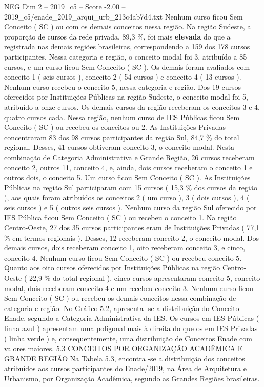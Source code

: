 \begin{textsample}{NEG Dim 2 – 2019\_c5 – Score -2.00 – 2019\_c5/enade\_2019\_arqui\_urb\_213c4ab7d4.txt}
Nenhum curso ficou Sem Conceito ( SC ) ou com os demais conceitos nessa região.
Na região Sudeste, a proporção de cursos da rede privada, 89,3 \%, foi mais \textbf{elevada} do que a registrada nas demais regiões brasileiras, correspondendo a 159 dos 178 cursos participantes.
Nessa categoria e região, o conceito modal foi 3, atribuído a 85 cursos, e um curso ficou Sem Conceito ( SC ).
Os demais foram avaliados com conceito 1 ( seis cursos ), conceito 2 ( 54 cursos ) e conceito 4 ( 13 cursos ).
Nenhum curso recebeu o conceito 5, nessa categoria e região.
Dos 19 cursos oferecidos por Instituições Públicas na região Sudeste, o conceito modal foi 5, atribuído a onze cursos.
Os demais cursos da região receberam os conceitos 3 e 4, quatro cursos cada.
Nessa região, nenhum curso de IES Públicas ficou Sem Conceito ( SC ) ou recebeu os conceitos ou 2.
As Instituições Privadas concentraram 83 dos 98 cursos participantes da região Sul, 84,7 \% do total regional.
Desses, 41 cursos obtiveram conceito 3, o conceito modal.
Nesta combinação de Categoria Administrativa e Grande Região, 26 cursos receberam conceito 2, outros 11, conceito 4, e, ainda, dois cursos receberam o conceito 1 e outros dois, o conceito 5.
Um curso ficou Sem Conceito ( SC ).
As Instituições Públicas na região Sul participaram com 15 cursos ( 15,3 \% dos cursos da região ), aos quais foram atribuídos os conceitos 2 ( um curso ), 3 ( dois cursos ), 4 ( seis cursos ) e 5 ( outros seis cursos ).
Nenhum curso da região Sul oferecido por IES Pública ficou Sem Conceito ( SC ) ou recebeu o conceito 1.
Na região Centro-Oeste, 27 dos 35 cursos participantes eram de Instituições Privadas ( 77,1 \% em termos regionais ).
Desses, 12 receberam conceito 2, o conceito modal.
Dos demais cursos, dois receberam conceito 1, oito receberam conceito 3, e cinco, conceito 4.
Nenhum curso ficou Sem Conceito ( SC ) ou recebeu conceito 5.
Quanto aos oito cursos oferecidos por Instituições Públicas na região Centro-Oeste ( 22,9 \% do total regional ), cinco cursos apresentaram conceito 5, conceito modal, dois receberam conceito 4 e um recebeu conceito 3.
Nenhum curso ficou Sem Conceito ( SC ) ou recebeu os demais conceitos nessa combinação de categoria e região.
No Gráfico 5.2, apresenta -se a distribuição do Conceito Enade, segundo a Categoria Administrativa da IES.
Os cursos em IES Públicas ( linha azul ) apresentam uma poligonal mais à direita do que os em IES Privadas ( linha verde ) e, consequentemente, uma distribuição de Conceitos Enade com valores maiores. 5.3 CONCEITOS POR ORGANIZAÇÃO ACADÊMICA E GRANDE REGIÃO Na Tabela 5.3, encontra -se a distribuição dos conceitos atribuídos aos cursos participantes do Enade/2019, na Área de Arquitetura e Urbanismo, por Organização Acadêmica, segundo as Grandes Regiões brasileiras.

\end{textsample}
